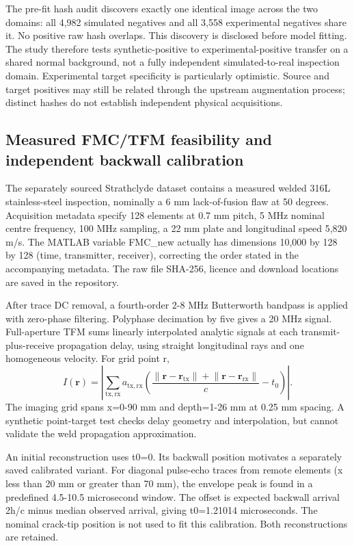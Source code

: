\documentclass[11pt,a4paper]{article}
\begin{document}
The pre-fit hash audit discovers exactly one identical image across the two domains: all 4,982 simulated negatives and all 3,558 experimental negatives share it. No positive raw hash overlaps. This discovery is disclosed before model fitting. The study therefore tests synthetic-positive to experimental-positive transfer on a shared normal background, not a fully independent simulated-to-real inspection domain. Experimental target specificity is particularly optimistic. Source and target positives may still be related through the upstream augmentation process; distinct hashes do not establish independent physical acquisitions.

\subsection{Measured FMC/TFM feasibility and independent backwall calibration}

The separately sourced Strathclyde dataset \cite{ref7} contains a measured welded 316L stainless-steel inspection, nominally a 6 mm lack-of-fusion flaw at 50 degrees. Acquisition metadata specify 128 elements at 0.7 mm pitch, 5 MHz nominal centre frequency, 100 MHz sampling, a 22 mm plate and longitudinal speed 5,820 m/s. The MATLAB variable FMC\_new actually has dimensions 10,000 by 128 by 128 (time, transmitter, receiver), correcting the order stated in the accompanying metadata. The raw file SHA-256, licence and download locations are saved in the repository.

After trace DC removal, a fourth-order 2-8 MHz Butterworth bandpass is applied with zero-phase filtering. Polyphase decimation by five gives a 20 MHz signal. Full-aperture TFM sums linearly interpolated analytic signals at each transmit-plus-receive propagation delay, using straight longitudinal rays and one homogeneous velocity. For grid point r, \[ I(\mathbf r)=\left|\sum_{\mathrm{tx},\mathrm{rx}}a_{\mathrm{tx},\mathrm{rx}}\!\left(\frac{\lVert\mathbf r-\mathbf r_{\mathrm{tx}}\rVert+\lVert\mathbf r-\mathbf r_{\mathrm{rx}}\rVert}{c}-t_0\right)\right|. \] The imaging grid spans x=0-90 mm and depth=1-26 mm at 0.25 mm spacing. A synthetic point-target test checks delay geometry and interpolation, but cannot validate the weld propagation approximation.

An initial reconstruction uses t0=0. Its backwall position motivates a separately saved calibrated variant. For diagonal pulse-echo traces from remote elements (x less than 20 mm or greater than 70 mm), the envelope peak is found in a predefined 4.5-10.5 microsecond window. The offset is expected backwall arrival 2h/c minus median observed arrival, giving t0=1.21014 microseconds. The nominal crack-tip position is not used to fit this calibration. Both reconstructions are retained.
\end{document}
